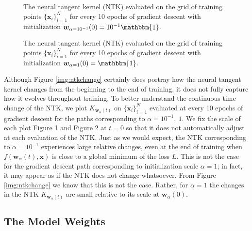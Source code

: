 \documentclass{article}
\begin{document}
\begin{figure}[H]
\caption{The neural tangent kernel (NTK) evaluated on the grid of training points $\{ \boldsymbol{x}_i \}_{i=1}^N$ for every 10 epochs of gradient descent with initialization $\boldsymbol{w}_{\alpha = 10^{-1}}(0) = 10^{-1}\mathbbm{1}$.}\label{gif:ntk1}
\end{figure}

\begin{figure}[H]
\caption{The neural tangent kernel (NTK) evaluated on the grid of training points $\{ \boldsymbol{x}_i \}_{i=1}^N$ for every 10 epochs of gradient descent with initialization $\boldsymbol{w}_{\alpha = 1}(0) = \mathbbm{1}$.}\label{gif:ntk2}
\end{figure}
\newpage

Although Figure \ref{img:ntkchange} certainly does portray how the neural tangent kernel changes from the beginning to the end of training, it does not fully capture how it evolves throughout training. To better understand the continuous time change of the NTK, we plot $K_{\boldsymbol{w}_{\alpha}(t)}$ on $\{ \boldsymbol{x}_i \}_{i=1}^N$ evaluated at every 10 epochs of gradient descent for the paths corresponding to $\alpha = 10^{-1}, \ 1$. We fix the scale of each plot Figure \ref{gif:ntk1} and Figure \ref{gif:ntk2} at $t = 0$ so that it does not automatically adjust at each evaluation of the NTK. Just as we would expect, the NTK corresponding to $\alpha = 10^{-1}$ experiences large relative changes, even at the end of training when $f(\boldsymbol{w}_{\alpha}(t), \boldsymbol{x})$ is close to a global minimum of the loss $L$. This is not the case for the gradient descent path corresponding to initialization scale $\alpha = 1$; in fact, it may appear as if the NTK does not change whatsoever. From Figure \ref{img:ntkchange} we know that this is not the case. Rather, for $\alpha = 1$ the changes in the NTK $K_{\boldsymbol{w}_{\alpha}(t)}$ are small relative to its scale at $\boldsymbol{w}_{\alpha}(0)$.

\subsection{The Model Weights}
\end{document}

